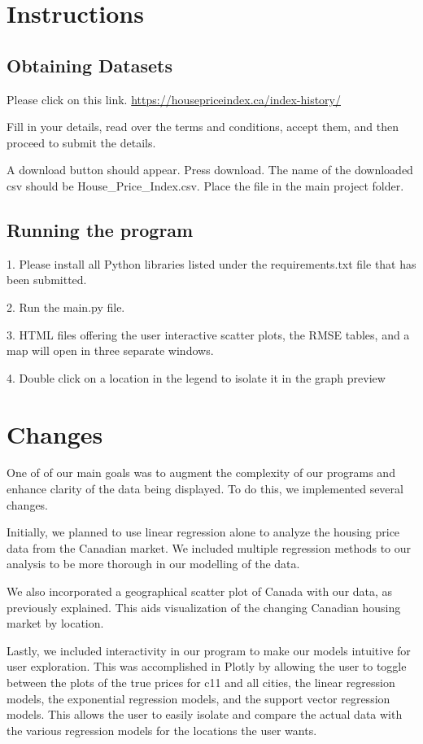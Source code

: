 \documentclass{article}
\begin{document}
\section{Instructions}

\subsection{Obtaining Datasets}
Please click on this link. \href{https://housepriceindex.ca/index-history/}{https://housepriceindex.ca/index-history/}

Fill in your details, read over the terms and conditions, accept them, and then proceed to submit the details.

A download button should appear. Press download. The name of the downloaded csv should be House\_Price\_Index.csv. Place the file in the main project folder.

\subsection{Running the program}

1. Please install all Python libraries listed under the requirements.txt file that has been submitted.

2. Run the main.py file.

3. HTML files offering the user interactive scatter plots, the RMSE tables, and a map will open in three separate windows.

4. Double click on a location in the legend to isolate it in the graph preview

\section{Changes}
One of of our main goals was to augment the complexity of our programs and enhance clarity of the data being displayed. To do this, we implemented several changes.

Initially, we planned to use linear regression alone to analyze the housing price data from the Canadian market. We included multiple regression methods to our analysis to be more thorough in our modelling of the data.

We also incorporated a geographical scatter plot of Canada with our data, as previously explained. This aids visualization of the changing Canadian housing market by location.

Lastly, we included interactivity in our program to make our models intuitive for user exploration. This was accomplished in Plotly by allowing the user to toggle between the plots of the true prices for c11 and all cities, the linear regression models, the exponential regression models, and the support vector regression models. This allows the user to easily isolate and compare the actual data with the various regression models for the locations the user wants.
\end{document}
